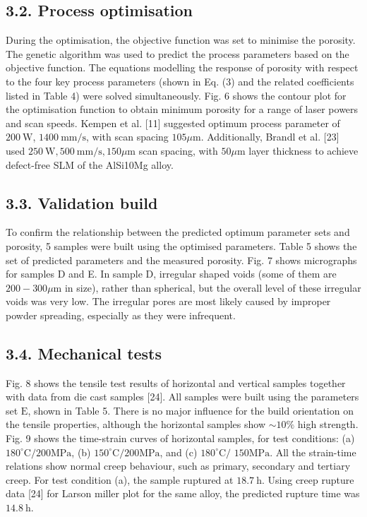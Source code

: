 \documentclass[10pt]{article}
\begin{document}
\subsection*{3.2. Process optimisation}
During the optimisation, the objective function was set to minimise the porosity. The genetic algorithm was used to predict the process parameters based on the objective function. The equations modelling the response of porosity with respect to the four key process parameters (shown in Eq. (3) and the related coefficients listed in Table 4) were solved simultaneously. Fig. 6 shows the contour plot for the optimisation function to obtain minimum porosity for a range of laser powers and scan speeds. Kempen et al. [11] suggested optimum process parameter of $200 \mathrm{~W}$, $1400 \mathrm{~mm} / \mathrm{s}$, with scan spacing $105 \mu \mathrm{m}$. Additionally, Brandl et al. [23] used $250 \mathrm{~W}, 500 \mathrm{~mm} / \mathrm{s}, 150 \mu \mathrm{m}$ scan spacing, with $50 \mu \mathrm{m}$ layer thickness to achieve defect-free SLM of the AlSi10Mg alloy.

\subsection*{3.3. Validation build}
To confirm the relationship between the predicted optimum parameter sets and porosity, 5 samples were built using the optimised parameters. Table 5 shows the set of predicted parameters and the measured porosity. Fig. 7 shows micrographs for samples D and E. In sample D, irregular shaped voids (some of them are $200-300 \mu \mathrm{m}$ in size), rather than spherical, but the overall level of these irregular voids was very low. The irregular pores are most likely caused by improper powder spreading, especially as they were infrequent.

\subsection*{3.4. Mechanical tests}
Fig. 8 shows the tensile test results of horizontal and vertical samples together with data from die cast samples [24]. All samples were built using the parameters set $\mathrm{E}$, shown in Table 5. There is no major influence for the build orientation on the tensile properties, although the horizontal samples show $\sim 10 \%$ high strength. Fig. 9 shows the time-strain curves of horizontal samples, for test conditions: (a) $180^{\circ} \mathrm{C} / 200 \mathrm{MPa}$, (b) $150^{\circ} \mathrm{C} / 200 \mathrm{MPa}$, and (c) $180^{\circ} \mathrm{C} /$ $150 \mathrm{MPa}$. All the strain-time relations show normal creep behaviour, such as primary, secondary and tertiary creep. For test condition (a), the sample ruptured at $18.7 \mathrm{~h}$. Using creep rupture data [24] for Larson miller plot for the same alloy, the predicted rupture time was $14.8 \mathrm{~h}$.
\end{document}
